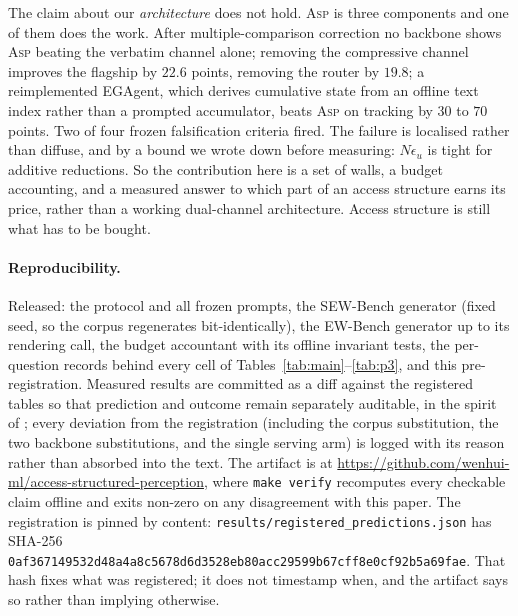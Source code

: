 \documentclass[10pt]{article}
\theoremstyle{definition}
\theoremstyle{plain}
\newcommand{\ASP}{\textsc{Asp}}
\begin{document}
The claim about our \emph{architecture} does not hold. \ASP{} is three components and one of
them does the work. After multiple-comparison correction no backbone shows \ASP{} beating the
verbatim channel alone; removing the compressive channel improves the flagship by $22.6$ points,
removing the router by $19.8$; a reimplemented EGAgent, which derives cumulative state from an
offline text index rather than a prompted accumulator, beats \ASP{} on tracking by $30$ to $70$
points. Two of four frozen falsification criteria fired. The failure is localised rather than
diffuse, and by a bound we wrote down before measuring: $N\epsilon_u$ is tight for additive
reductions. So the contribution here is a set of walls, a budget accounting, and a measured
answer to which part of an access structure earns its price, rather than a working dual-channel
architecture. Access structure is still what has to be bought.

\paragraph{Reproducibility.} Released: the protocol and all frozen prompts, the SEW-Bench generator (fixed seed, so the corpus regenerates bit-identically), the EW-Bench generator up to its rendering call, the budget accountant with its offline invariant tests, the per-question records behind every cell of Tables~\ref{tab:main}--\ref{tab:p3}, and this pre-registration. Measured results are committed as a diff against the registered tables so that prediction and outcome remain separately auditable, in the spirit of \citep{cch}; every deviation from the registration (including the corpus substitution, the two backbone substitutions, and the single serving arm) is logged with its reason rather than absorbed into the text. The artifact is at \url{https://github.com/wenhui-ml/access-structured-perception}, where \texttt{make verify} recomputes every checkable claim offline and exits non-zero on any disagreement with this paper. The registration is pinned by content: \texttt{results/registered\_predictions.json} has SHA-256 {\small \texttt{0af367149532d48a}\allowbreak \texttt{4a8c5678d6d3528e}\allowbreak \texttt{b80acc29599b67cf}\allowbreak \texttt{f8e0cf92b5a69fae}}. That hash fixes what was registered; it does not timestamp when, and the artifact says so rather than implying otherwise.





\clearpage
\appendix
\end{document}
